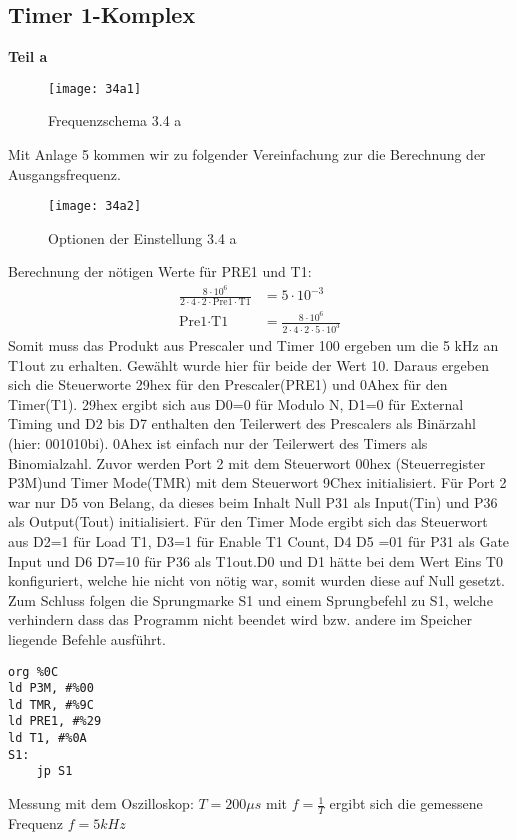 \subsection{Timer 1-Komplex}
\textbf{Teil a}
\begin{figure}[!ht]
\begin{center}
\texttt{[image: 34a1]} 
\caption{Frequenzschema 3.4 a}
\label{341a}
\end{center}
\end{figure}

Mit Anlage 5 kommen wir zu folgender  Vereinfachung zur die Berechnung der Ausgangsfrequenz.


\begin{figure}[!ht]
\begin{center}
\texttt{[image: 34a2]} 
\caption{Optionen der Einstellung 3.4 a}
\label{34a1}
\end{center}
\end{figure}


Berechnung der nötigen Werte für PRE1 und T1:
\begin{align*}
\frac{8\cdot 10^6}{2\cdot4\cdot2\cdot\text{Pre1}\cdot\text{T1}}&=5\cdot10^{-3}\\
\text{Pre1}\cdot\text{T1}&= \frac{8\cdot10^6}{2\cdot4\cdot2\cdot5\cdot10^3}
\end{align*}
Somit muss das Produkt aus Prescaler und Timer 100 ergeben um die 5 kHz an T1out zu erhalten. Gewählt wurde hier für beide der Wert 10. Daraus ergeben sich die Steuerworte 29hex für den Prescaler(PRE1) und 0Ahex für den Timer(T1). 29hex ergibt sich aus D0=0 für Modulo N, D1=0 für External Timing und D2 bis D7 enthalten den Teilerwert des Prescalers als Binärzahl (hier: 001010bi). 0Ahex ist einfach nur der Teilerwert des Timers als Binomialzahl.
Zuvor werden Port 2 mit dem Steuerwort 00hex (Steuerregister P3M)und  Timer Mode(TMR) mit dem Steuerwort 9Chex initialisiert. Für Port 2 war nur D5 von Belang, da dieses  beim Inhalt  Null P31 als Input(Tin) und  P36 als Output(Tout) initialisiert. Für den Timer Mode ergibt sich das Steuerwort aus D2=1 für Load T1, D3=1 für Enable T1 Count, D4 D5 =01 für P31 als Gate Input und D6 D7=10 für P36 als T1out.D0 und D1 hätte bei dem Wert Eins T0 konfiguriert, welche hie nicht von nötig war, somit wurden diese auf Null gesetzt.
Zum Schluss folgen die Sprungmarke S1 und einem Sprungbefehl zu S1, welche verhindern dass das Programm nicht beendet wird bzw.  andere im Speicher liegende Befehle ausführt.

\begin{verbatim}
org %0C
ld P3M, #%00
ld TMR, #%9C
ld PRE1, #%29
ld T1, #%0A
S1:
	jp S1
\end{verbatim}
Messung mit dem Oszilloskop: $T= 200\mu s $ mit $f=\frac{1}{T}$ ergibt sich die gemessene Frequenz $f=5 kHz$

